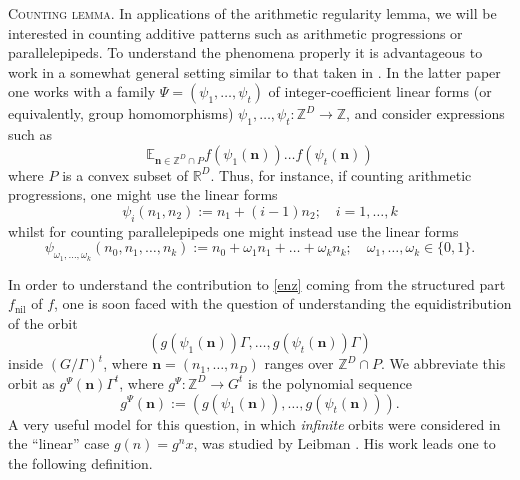 \documentclass[11pt,reqno]{amsart}
\numberwithin{equation}{section}
\theoremstyle{plain}
\theoremstyle{definition}
\newcommand\E{{\mathbb{E}}}
\newcommand\Z{\mathbb{Z}}
\newcommand\R{\mathbb{R}}
\newcommand\1{{\bf 1}}
\newcommand\2{{\bf 2}}
\newcommand\nil{{\operatorname{nil}}}
\begin{document}
\textsc{Counting lemma.} In applications of the arithmetic regularity lemma, we will be interested in counting additive patterns such as arithmetic progressions or parallelepipeds.
To understand the phenomena properly it is advantageous to work in a somewhat general setting similar to that taken in \cite{gowers-wolf-1,gowers-wolf-2,gowers-wolf-3,green-tao-linearprimes}. In the latter paper one works with a family $\Psi = (\psi_1,\ldots,\psi_t)$ of integer-coefficient linear forms (or equivalently, group homomorphisms) $\psi_1,\ldots,\psi_t: \Z^D \to \Z$, and consider expressions such as
\begin{equation}\label{enz}
\E_{\mathbf{n} \in \Z^D \cap P} f( \psi_1(\mathbf{n}) ) \ldots f( \psi_t(\mathbf{n}) )
\end{equation}
where $P$ is a convex subset of $\R^D$.  Thus, for instance, if counting arithmetic progressions, one might use the linear forms
\begin{equation}\label{hp-lattice} 
\psi_i(n_1,n_2) := n_1 + (i-1) n_2; \quad i=1,\ldots,k
\end{equation}
whilst for counting parallelepipeds one might instead use the linear forms
\begin{equation}\label{hk-lattice} 
\psi_{\omega_1,\ldots,\omega_k}(n_0,n_1,\ldots,n_k) := n_0+\omega_1n_1+\ldots+\omega_kn_k; \quad \omega_1,\ldots,\omega_k \in \{0,1\}.\end{equation}

In order to understand the contribution to \eqref{enz} coming from the structured part $f_\nil$ of $f$, one is soon faced with the question of understanding the equidistribution of the orbit
\begin{equation}\label{v-orbit} (g(\psi_1(\mathbf{n})) \Gamma,\dots, g(\psi_t(\mathbf{n})) \Gamma)\end{equation} 
inside $(G/\Gamma)^t$, where $\mathbf{n} = (n_1,\ldots,n_D)$ ranges over $\Z^D \cap P$. We abbreviate this orbit as $g^\Psi({\mathbf n}) \Gamma^t$, where $g^\Psi: \Z^D \to G^t$ is the polynomial sequence
\begin{equation}\label{gpsi-def}
g^\Psi({\mathbf n}) := (g(\psi_1(\mathbf{n})),\dots, g(\psi_t(\mathbf{n}))).
\end{equation}
A very useful model for this question, in which \emph{infinite} orbits were considered in the ``linear'' case $g(n) = g^nx$, was studied by Leibman \cite{leibman-orb-diag}.  His work leads one to the following definition.
\end{document}
